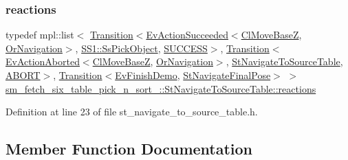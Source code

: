 \subsubsection{\texorpdfstring{reactions}{reactions}}
{\footnotesize\ttfamily typedef mpl\+::list$<$ \hyperlink{classsmacc_1_1Transition}{Transition}$<$\hyperlink{structsmacc_1_1default__events_1_1EvActionSucceeded}{Ev\+Action\+Succeeded}$<$\hyperlink{classcl__move__base__z_1_1ClMoveBaseZ}{Cl\+Move\+BaseZ}, \hyperlink{classsm__fetch__six__table__pick__n__sort__1_1_1OrNavigation}{Or\+Navigation}$>$, \hyperlink{structsm__fetch__six__table__pick__n__sort__1_1_1SS1_1_1SsPickObject}{S\+S1\+::\+Ss\+Pick\+Object}, \hyperlink{structsmacc_1_1default__transition__tags_1_1SUCCESS}{S\+U\+C\+C\+E\+SS}$>$, \hyperlink{classsmacc_1_1Transition}{Transition}$<$\hyperlink{structsmacc_1_1default__events_1_1EvActionAborted}{Ev\+Action\+Aborted}$<$\hyperlink{classcl__move__base__z_1_1ClMoveBaseZ}{Cl\+Move\+BaseZ}, \hyperlink{classsm__fetch__six__table__pick__n__sort__1_1_1OrNavigation}{Or\+Navigation}$>$, \hyperlink{structsm__fetch__six__table__pick__n__sort__1_1_1StNavigateToSourceTable}{St\+Navigate\+To\+Source\+Table}, \hyperlink{structsmacc_1_1default__transition__tags_1_1ABORT}{A\+B\+O\+RT}$>$, \hyperlink{classsmacc_1_1Transition}{Transition}$<$\hyperlink{structsm__fetch__six__table__pick__n__sort__1_1_1EvFinishDemo}{Ev\+Finish\+Demo}, \hyperlink{structsm__fetch__six__table__pick__n__sort__1_1_1StNavigateFinalPose}{St\+Navigate\+Final\+Pose}$>$ $>$ \hyperlink{structsm__fetch__six__table__pick__n__sort__1_1_1StNavigateToSourceTable_a9cecc0b1d0a924176908b3e32eb3d2e9}{sm\+\_\+fetch\+\_\+six\+\_\+table\+\_\+pick\+\_\+n\+\_\+sort\+\_\+::\+St\+Navigate\+To\+Source\+Table\+::reactions}}



Definition at line 23 of file st\+\_\+navigate\+\_\+to\+\_\+source\+\_\+table.\+h.



\subsection{Member Function Documentation}
\mbox{\label{structsm__fetch__six__table__pick__n__sort__1_1_1StNavigateToSourceTable_aff505f7bdc92511e1fce3c703c7165a4}} 
